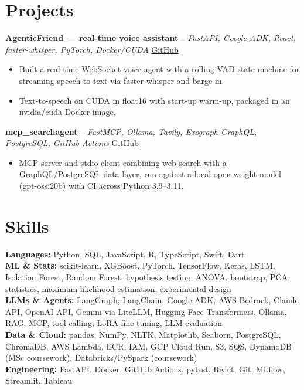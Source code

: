 \documentclass[a4paper,10pt]{article}
\begin{document}
\section{Projects}
\noindent\textbf{AgenticFriend — real-time voice assistant} -- \textit{FastAPI, Google ADK, React, faster-whisper, PyTorch, Docker/CUDA} \hfill \href{https://github.com/Thiruvel-AP/adk_multi-agent}{GitHub}
\begin{itemize}
  \item Built a real-time WebSocket voice agent with a rolling VAD state machine for streaming speech-to-text via faster-whisper and barge-in.
  \item Text-to-speech on CUDA in float16 with start-up warm-up, packaged in an nvidia/cuda Docker image.
\end{itemize}
\noindent\textbf{mcp\_searchagent} -- \textit{FastMCP, Ollama, Tavily, Exograph GraphQL, PostgreSQL, GitHub Actions} \hfill \href{https://github.com/Thiruvel-AP/mcp_searchagent}{GitHub}
\begin{itemize}
  \item MCP server and stdio client combining web search with a GraphQL/PostgreSQL data layer, run against a local open-weight model (gpt-oss:20b) with CI across Python 3.9–3.11.
\end{itemize}

\section{Skills}
\textbf{Languages:} Python, SQL, JavaScript, R, TypeScript, Swift, Dart\\
\textbf{ML \& Stats:} scikit-learn, XGBoost, PyTorch, TensorFlow, Keras, LSTM, Isolation Forest, Random Forest, hypothesis testing, ANOVA, bootstrap, PCA, statistics, maximum likelihood estimation, experimental design\\
\textbf{LLMs \& Agents:} LangGraph, LangChain, Google ADK, AWS Bedrock, Claude API, OpenAI API, Gemini via LiteLLM, Hugging Face Transformers, Ollama, RAG, MCP, tool calling, LoRA fine-tuning, LLM evaluation\\
\textbf{Data \& Cloud:} pandas, NumPy, NLTK, Matplotlib, Seaborn, PostgreSQL, ChromaDB, AWS Lambda, ECR, IAM, GCP Cloud Run, S3, SQS, DynamoDB (MSc coursework), Databricks/PySpark (coursework)\\
\textbf{Engineering:} FastAPI, Docker, GitHub Actions, pytest, React, Git, MLflow, Streamlit, Tableau
\end{document}
